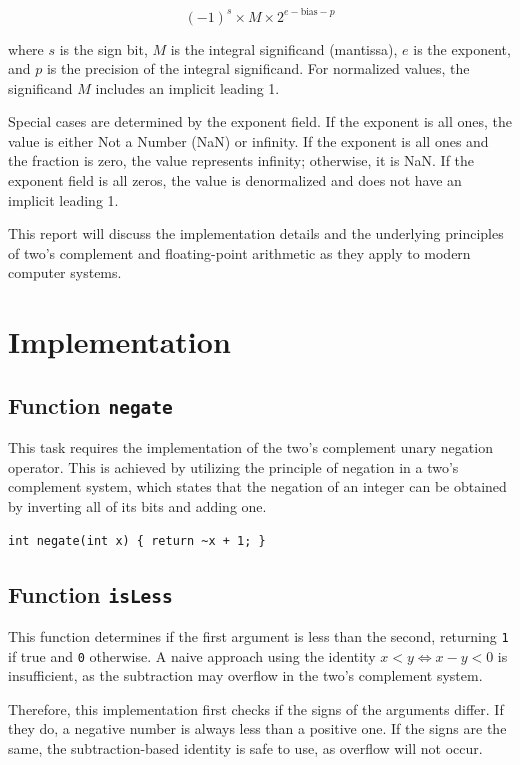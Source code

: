 \documentclass{article}
\begin{document}
$$(-1)^s \times M \times 2^{e - \textrm{bias} - p}$$

where $s$ is the sign bit, $M$ is the integral significand (mantissa), $e$ is 
the exponent, and $p$ is the precision of the integral significand. For 
normalized values, the significand $M$ includes an implicit leading 1.

Special cases are determined by the exponent field. If the exponent is all ones, 
the value is either Not a Number (NaN) or infinity. If the exponent is all ones 
and the fraction is zero, the value represents infinity; otherwise, it is NaN. 
If the exponent field is all zeros, the value is denormalized and does not have 
an implicit leading 1.

This report will discuss the implementation details and the underlying
principles of two's complement and floating-point arithmetic as they apply to
modern computer systems.

\section{Implementation}

\subsection{Function \texttt{negate}}

This task requires the implementation of the two's complement unary negation
operator. This is achieved by utilizing the principle of negation in a two's
complement system, which states that the negation of an integer can be
obtained by inverting all of its bits and adding one.

\begin{verbatim}
int negate(int x) { return ~x + 1; }
\end{verbatim}

\subsection{Function \texttt{isLess}}

This function determines if the first argument is less than the second,
returning \verb|1| if true and \verb|0| otherwise. A naive approach using the 
identity $x < y \iff x - y < 0$ is insufficient, as the subtraction may overflow 
in the two's complement system.

Therefore, this implementation first checks if the signs of the arguments
differ. If they do, a negative number is always less than a positive one. If the
signs are the same, the subtraction-based identity is safe to use, as overflow
will not occur.
\end{document}
